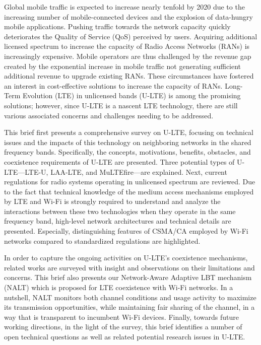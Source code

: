%
%

\preface

Global mobile traffic is expected to increase nearly tenfold by 2020 due to the increasing number of mobile-connected devices and the explosion of data-hungry mobile applications. Pushing traffic towards the network capacity quickly deteriorates the Quality of Service (QoS) perceived by users. Acquiring additional licensed spectrum to increase the capacity of Radio Access Networks (RANs) is increasingly expensive. Mobile operators are thus challenged by the revenue gap created by the exponential increase in mobile traffic not generating sufficient additional revenue to upgrade existing RANs. These circumstances have fostered an interest in cost-effective solutions to increase the capacity of RANs. Long-Term Evolution (LTE) in unlicensed bands (U-LTE) is among the promising solutions; however, since U-LTE is a nascent LTE technology, there are still various associated concerns and challenges needing to be addressed.

This brief first presents a comprehensive survey on U-LTE, focusing on technical issues and the impacts of this technology on neighboring networks in the shared frequency bands. Specifically, the concepts, motivations, benefits, obstacles, and coexistence requirements of U-LTE are presented. Three potential types of U-LTE---LTE-U, LAA-LTE, and MuLTEfire---are explained. Next, current regulations for radio systems operating in unlicensed spectrum are reviewed. Due to the fact that technical knowledge of the medium access mechanisms employed by LTE and Wi-Fi is strongly required to understand and analyze the interactions between these two technologies when they operate in the same frequency band, high-level network architectures and technical details are presented. Especially, distinguishing features of CSMA/CA employed by Wi-Fi networks compared to standardized regulations are highlighted.   

In order to capture the ongoing activities on U-LTE’s coexistence mechanisms, related works are surveyed with insight and observations on their limitations and concerns.  This brief also presents our Network-Aware Adaptive LBT mechanism (NALT) which is proposed for LTE coexistence with Wi-Fi networks. In a nutshell, NALT monitors both channel conditions and usage activity to maximize its transmission opportunities, while maintaining fair sharing of the channel, in a way that is transparent to incumbent Wi-Fi devices. Finally, towards future working directions, in the light of the survey, this brief identifies a number of open technical questions as well as related potential research issues in U-LTE.

